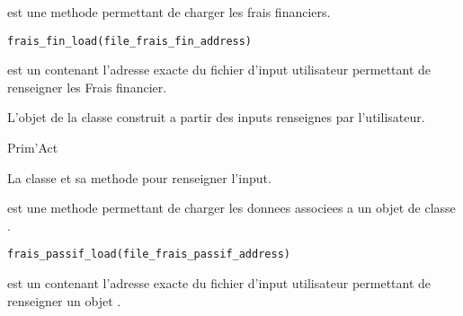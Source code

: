 \documentclass[a4paper]{book}
\begin{document}
%
\begin{Description}\relax
{} est une methode permettant de charger les frais financiers.
\end{Description}
%
\begin{Usage}
\begin{verbatim}
frais_fin_load(file_frais_fin_address)
\end{verbatim}
\end{Usage}
%
\begin{Arguments}
\begin{ldescription}
\item[\code{file\_frais\_fin\_address}] est un  contenant l'adresse exacte du fichier d'input utilisateur permettant de renseigner les Frais financier.
\end{ldescription}
\end{Arguments}
%
\begin{Value}
L'objet de la classe  construit a partir des inputs renseignes par l'utilisateur.
\end{Value}
%
\begin{Author}\relax
Prim'Act
\end{Author}
%
\begin{SeeAlso}\relax
La classe  et sa methode  pour renseigner l'input.
\end{SeeAlso}
%
\begin{Description}\relax
{} est une methode permettant de charger les donnees associees a un
objet de classe .
\end{Description}
%
\begin{Usage}
\begin{verbatim}
frais_passif_load(file_frais_passif_address)
\end{verbatim}
\end{Usage}
%
\begin{Arguments}
\begin{ldescription}
\item[\code{file\_frais\_passif\_address}] est un  contenant l'adresse exacte du fichier d'input utilisateur
permettant de renseigner un objet .
\end{ldescription}
\end{Arguments}
\end{document}
